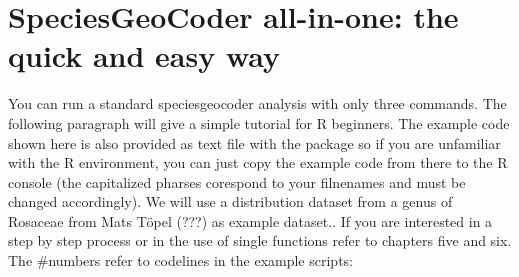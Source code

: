 \documentclass[a4paper,titlepage,11pt]{scrreprt}
\begin{document}
\chapter{SpeciesGeoCoder all-in-one: the quick and easy way} \label{allinone}


You can run a standard speciesgeocoder analysis with only three commands. The following paragraph will give a simple tutorial for R beginners. The example code shown here is also provided as text file with the package so if you are unfamiliar with the R environment, you can just copy the example code from there to the R console (the capitalized pharses corespond to your filnenames and must be changed accordingly). We will use a distribution dataset from a genus of Rosaceae from Mats Töpel (???) as example dataset.. If you are interested in a step by step process or in the use of single functions refer to chapters five and six. The \#numbers refer to codelines in the example scripts:
\end{document}
